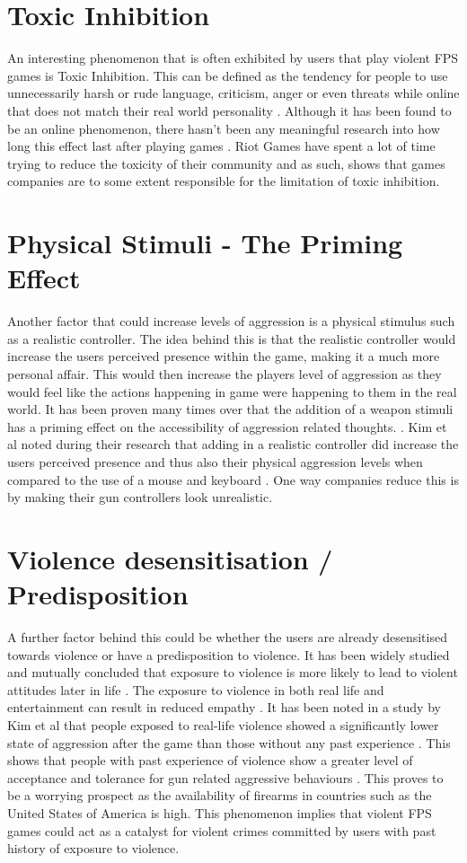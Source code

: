 \documentclass{scrartcl}
\begin{document}
\section{Toxic Inhibition}
An interesting phenomenon that is often exhibited by users that play violent FPS games is Toxic Inhibition. This can be defined as the tendency for people to use unnecessarily harsh or rude language, criticism, anger or even threats while online that does not match their real world personality \cite{rawn2008examining}. Although it has been found to be an online phenomenon, there hasn't been any meaningful research into how long this effect last after playing games \cite{rawn2008examining}. Riot Games have spent a lot of time trying to reduce the toxicity of their community and as such, shows that games companies are to some extent responsible for the limitation of toxic inhibition.

\section{Physical Stimuli - The Priming Effect}
Another factor that could increase levels of aggression is a physical stimulus such as a realistic controller. The idea behind this is that the realistic controller would increase the users perceived presence within the game, making it a much more personal affair. This would then increase the players level of aggression as they would feel like the actions happening in game were happening to them in the real world. It has been proven many times over that the addition of a weapon stimuli has a priming effect on the accessibility of aggression related thoughts. \cite{kim2011effects}. Kim et al noted during their research that adding in a realistic controller did increase the users perceived presence and thus also their physical aggression levels when compared to the use of a mouse and keyboard \cite {kim2011effects}. One way companies reduce this is by making their gun controllers look unrealistic.

\section {Violence desensitisation / Predisposition}
A further factor behind this could be whether the users are already desensitised towards violence or have a predisposition to violence. It has been widely studied and mutually concluded that exposure to violence is more likely to lead to violent attitudes later in life \cite{kim2011effects}. The exposure to violence in both real life and entertainment can result in reduced empathy \cite{kim2011effects}. It has been noted in a study by Kim et al that people exposed to real-life violence showed a significantly lower state of aggression after the game than those without any past experience \cite{kim2011effects}. This shows that people with past experience of violence show a greater level of acceptance and tolerance for gun related aggressive behaviours \cite{kim2011effects}. This proves to be a worrying prospect as the availability of firearms in countries such as the United States of America is high. This phenomenon implies that violent FPS games could act as a catalyst for violent crimes committed by users with past history of exposure to violence.
\end{document}
